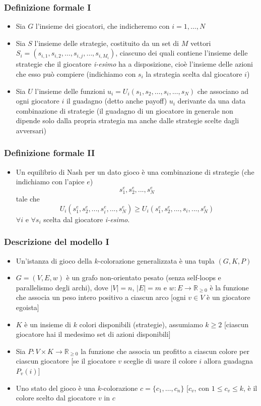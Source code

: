 \documentclass{beamer}
\begin{document}
\begin{frame}
\frametitle{Definizione formale I}
\begin{itemize}
	\item Sia $G$ l'insieme dei \alert{giocatori}, che indicheremo con $i=1,\ldots,N$
	\item Sia $S$ l'insieme delle \alert{strategie}, costituito da un set di \(M\) vettori $S_{i}=\left(s_{{i,1}},s_{{i,2}},\ldots,s_{{i,j}},\ldots,s_{{i,M_{i}}}\right)$, ciascuno dei quali contiene l'insieme delle strategie che il giocatore \textit{i-esimo} ha a disposizione, cioè l'insieme delle azioni che esso può compiere (indichiamo con $s_i$ la strategia scelta dal giocatore $i$)
	\item Sia $U$ l'insieme delle \alert{funzioni} $u_{i}=U_{i}\left(s_{1},s_{2},\ldots,s_{i},\ldots,s_{N}\right)$ che associano ad ogni giocatore $i$ il guadagno (detto anche payoff) $u_i$ derivante da una data combinazione di strategie (il guadagno di un giocatore in generale non dipende solo dalla propria strategia ma anche dalle strategie scelte dagli avversari) 
\end{itemize}
\end{frame}


\begin{frame}
\frametitle{Definizione formale II}
\begin{itemize}
	\item Un \alert{equilibrio di Nash} per un dato gioco è una combinazione di strategie (che indichiamo con l'apice $e$) \[s_{1}^{e},s_{2}^{e},...,s_{N}^{e}\] tale che \[U_{i}\left(s_{1}^{e},s_{2}^{e},...,s_{i}^{e},...,s_{N}^{e}\right)\geq U_{i}\left(s_{1}^{e},s_{2}^{e},...,s_{i},...,s_{N}^{e}\right)\] $\forall i$ e $\forall s_i$ scelta dal giocatore \textit{i-esimo}.
\end{itemize}
\end{frame}


\begin{frame}
\frametitle{Descrizione del modello I}
\begin{itemize}
	\item Un'\alert{istanza} di gioco della $k$-colorazione generalizzata è una tupla $(G,K,P)$
	\item $G=(V,E,w)$ è un \alert{grafo} non-orientato pesato (senza self-loops e parallelismo degli archi), dove $|V|=n$, $|E|=m$ e $w : E\rightarrow\mathds{R}_{\geq 0}$ è la \alert{funzione} che associa un \alert{peso} intero positivo a ciascun arco [ogni $v \in V$ è un giocatore egoista]
	\item $K$ è un insieme di $k$ \alert{colori} disponibili (strategie), assumiamo $k\geq2$ [ciascun giocatore hai il medesimo set di azioni disponibili]
	\item Sia $P : V \times K \rightarrow \mathds{R}_{\geq 0}$ la \alert{funzione} che associa un \alert{profitto} a ciascun colore per ciascun giocatore [se il giocatore $v$ sceglie di usare il colore $i$ allora guadagna $P_v (i)$]
	\item Uno \alert{stato del gioco} è una $k$-colorazione $c = \{c_1,\ldots,c_n\}$ [$c_v$, con $1 \leq c_v \leq k$, è il colore scelto dal giocatore $v$ in $c$
\end{itemize}
\end{frame}
\end{document}
